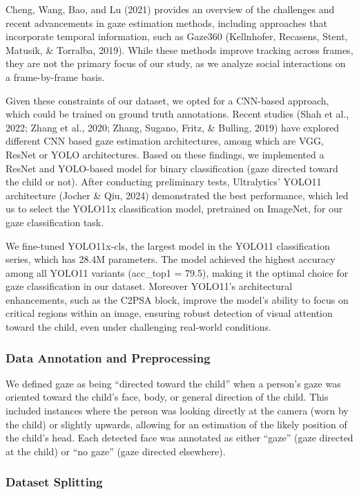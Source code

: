 \documentclass[
  man,floatsintext]{apa6}
\begin{document}
Cheng, Wang, Bao, and Lu (2021) provides an overview of the challenges and recent advancements in gaze estimation methods, including approaches that incorporate temporal information, such as Gaze360 (Kellnhofer, Recasens, Stent, Matusik, \& Torralba, 2019). While these methods improve tracking across frames, they are not the primary focus of our study, as we analyze social interactions on a frame-by-frame basis.

Given these constraints of our dataset, we opted for a CNN-based approach, which could be trained on ground truth annotations. Recent studies (Shah et al., 2022; Zhang et al., 2020; Zhang, Sugano, Fritz, \& Bulling, 2019) have explored different CNN based gaze estimation architectures, among which are VGG, ResNet or YOLO architectures. Based on these findings, we implemented a ResNet and YOLO-based model for binary classification (gaze directed toward the child or not). After conducting preliminary tests, Ultralytics' YOLO11 architecture (Jocher \& Qiu, 2024) demonstrated the best performance, which led us to select the YOLO11x classification model, pretrained on ImageNet, for our gaze classification task.

We fine-tuned YOLO11x-cls, the largest model in the YOLO11 classification series, which has 28.4M parameters. The model achieved the highest accuracy among all YOLO11 variants (acc\_top1 = 79.5), making it the optimal choice for gaze classification in our dataset. Moreover YOLO11's architectural enhancements, such as the C2PSA block, improve the model's ability to focus on critical regions within an image, ensuring robust detection of visual attention toward the child, even under challenging real-world conditions.

\subsubsection{Data Annotation and Preprocessing}\label{data-annotation-and-preprocessing-1}

We defined gaze as being ``directed toward the child'' when a person's gaze was oriented toward the child's face, body, or general direction of the child. This included instances where the person was looking directly at the camera (worn by the child) or slightly upwards, allowing for an estimation of the likely position of the child's head. Each detected face was annotated as either ``gaze'' (gaze directed at the child) or ``no gaze'' (gaze directed elsewhere).

\subsubsection{Dataset Splitting}\label{dataset-splitting-1}
\end{document}
